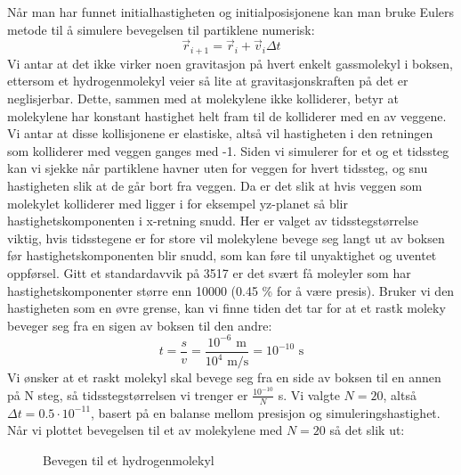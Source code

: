 \documentclass[reprint,english,notitlepage]{revtex4-1}
\begin{document}
	\vspace{0.5cm}

	Når man har funnet initialhastigheten og initialposisjonene kan man bruke Eulers
	metode til å simulere bevegelsen til partiklene numerisk:
		$$\vec{r}_{i+1} = \vec{r}_{i} + \vec{v}_i\Delta t$$
	Vi antar at det ikke virker noen gravitasjon på hvert enkelt gassmolekyl i
	boksen, ettersom et hydrogenmolekyl veier så lite at gravitasjonskraften på det er
	neglisjerbar. Dette, sammen med at molekylene ikke kolliderer, betyr at
	molekylene har konstant hastighet helt fram til de kolliderer
	med en av veggene. Vi antar at disse kollisjonene er elastiske,
	altså vil hastigheten i den retningen som kolliderer med veggen ganges med -1.
	Siden vi simulerer for et og et tidssteg kan vi sjekke når partiklene havner uten for veggen
	for hvert tidssteg, og snu hastigheten slik at de går bort fra veggen.
	Da er det slik at hvis veggen som molekylet kolliderer med ligger i for eksempel
	yz-planet så blir hastighetskomponenten i x-retning snudd. Her er valget av
	tidsstegstørrelse viktig, hvis tidsstegene er for store vil molekylene bevege
	seg langt ut av boksen før hastighetskomponenten blir snudd, som kan føre til
	unyaktighet og uventet oppførsel. Gitt et standardavvik på 3517 er det svært
	få moleyler som har hastighetskomponenter større enn 10000 (0.45 \% for å være presis).
	Bruker vi den hastigheten som en øvre grense, kan vi finne tiden det tar for at et
	rastk moleky beveger seg fra en sigen av boksen til den andre:
	$$t = \frac{s}{v} = \frac{10^{-6}\text{ m}}{10^{4}\text{ m/s}} = 10^{-10} \text{ s}$$
	Vi ønsker at et raskt molekyl
	skal bevege seg fra en side av boksen til en annen på N steg, så
	tidsstegstørrelsen vi trenger er $\frac{10^{-10}}{N}$ s. Vi valgte $N = 20$,
	altså $\Delta t = 0.5 \cdot 10^{-11}$, basert
	på en balanse mellom presisjon og simuleringshastighet. Når vi plottet bevegelsen
	til et av molekylene med $N = 20$ så det slik ut:
	\newpage
	\begin{figure}
		\centering
		\caption{Bevegen til et hydrogenmolekyl}
	\end{figure}
\end{document}
